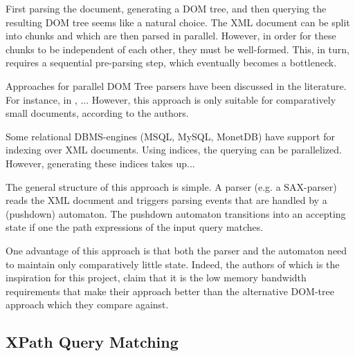  First parsing the document, generating a DOM
tree, and then querying the resulting DOM tree seems like a natural choice. The
XML document can be split into chunks and which are then parsed in parallel.
However, in order for these chunks to be independent of each other, they must be
well-formed. This, in turn, requires a sequential pre-parsing step, which
eventually becomes a bottleneck.

Approaches for parallel DOM Tree parsers have been discussed in the literature.
For instance, in , ... However, this approach is only suitable
for comparatively small documents, according to the authors.


Some relational DBMS-engines (MSQL, MySQL, MonetDB) have support for indexing
over XML documents. Using indices, the querying can be parallelized. However,
generating these indices takes up...

 The general structure of this approach
is simple. A parser (e.g. a SAX-parser) reads the XML document and triggers
parsing events that are handled by a (pushdown) automaton. The pushdown
automaton transitions into an accepting state if one the path expressions of the
input query matches.

One advantage of this approach is that both the parser and the automaton need to
maintain only comparatively little state. Indeed, the authors of 
which is the inspiration for this project, claim that it is the low memory
bandwidth requirements that make their approach better than the alternative
DOM-tree approach which they compare against.


\subsection{XPath Query Matching}







